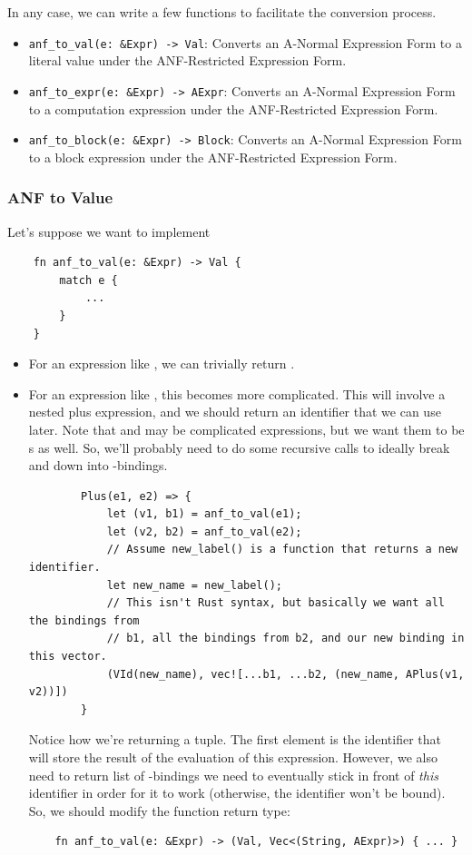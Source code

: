 In any case, we can write a few functions to facilitate the conversion process.
\begin{itemize}
    \item \verb|anf_to_val(e: &Expr) -> Val|: Converts an A-Normal Expression Form to a literal value under the ANF-Restricted Expression Form.
    \item \verb|anf_to_expr(e: &Expr) -> AExpr|: Converts an A-Normal Expression Form to a computation expression under the ANF-Restricted Expression Form.
    \item \verb|anf_to_block(e: &Expr) -> Block|: Converts an A-Normal Expression Form to a block expression under the ANF-Restricted Expression Form. 
\end{itemize}

\subsubsection{ANF to Value}
Let's suppose we want to implement 
\begin{verbatim}
    fn anf_to_val(e: &Expr) -> Val {
        match e {
            ...
        }
    }\end{verbatim}

\begin{itemize}
    \item For an expression  like , we can trivially return .
    \item For an expression  like , this becomes more complicated. This will involve a nested plus expression, and we should return an identifier that we can use later. Note that  and  may be complicated expressions, but we want them to be s as well. So, we'll probably need to do some recursive calls to ideally break  and  down into -bindings. 
    \begin{verbatim}
        Plus(e1, e2) => {
            let (v1, b1) = anf_to_val(e1);
            let (v2, b2) = anf_to_val(e2);
            // Assume new_label() is a function that returns a new identifier.
            let new_name = new_label(); 
            // This isn't Rust syntax, but basically we want all the bindings from 
            // b1, all the bindings from b2, and our new binding in this vector.
            (VId(new_name), vec![...b1, ...b2, (new_name, APlus(v1, v2))])
        }\end{verbatim}
    Notice how we're returning a tuple. The first element is the identifier that will store the result of the evaluation of this expression. However, we also need to return list of -bindings we need to eventually stick in front of \emph{this} identifier in order for it to work (otherwise, the identifier won't be bound). So, we should modify the function return type: 
    \begin{verbatim}
    fn anf_to_val(e: &Expr) -> (Val, Vec<(String, AExpr)>) { ... }\end{verbatim}
\end{itemize}

